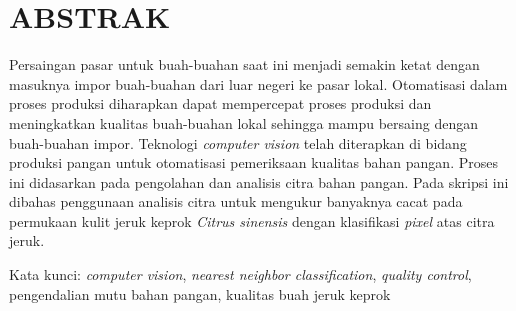 \documentclass[laporan.tex]{subfiles}
\begin{document}
\chapter*{ABSTRAK}

Persaingan pasar untuk buah-buahan saat ini menjadi semakin ketat dengan masuknya impor buah-buahan dari luar negeri ke pasar lokal. Otomatisasi dalam proses produksi diharapkan dapat mempercepat proses produksi dan meningkatkan kualitas buah-buahan lokal sehingga mampu bersaing dengan buah-buahan impor. Teknologi \emph{computer vision} telah diterapkan di bidang produksi pangan untuk otomatisasi pemeriksaan kualitas bahan pangan. Proses ini didasarkan pada pengolahan dan analisis citra bahan pangan. Pada skripsi ini dibahas penggunaan analisis citra untuk mengukur banyaknya cacat pada permukaan kulit jeruk keprok \emph{Citrus sinensis} dengan klasifikasi \emph{pixel} atas citra jeruk.

Kata kunci: \emph{computer vision}, \emph{nearest neighbor classification}, \emph{quality control}, pengendalian mutu bahan pangan, kualitas buah jeruk keprok
\end{document}
